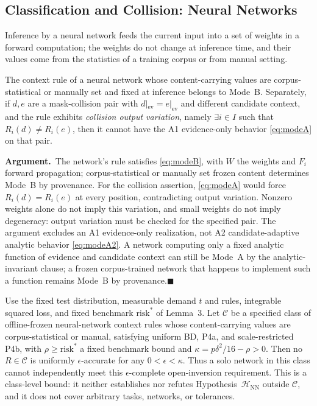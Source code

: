 \documentclass[twoside,11pt]{article}
\newcommand{\argument}{\par\medskip\noindent\textbf{Argument.}\ }
\newcommand{\qedbox}{\hfill$\blacksquare$}
\newcommand{\ev}{\mathrm{ev}}
\begin{document}
\subsection{Classification and Collision: Neural Networks}

Inference by a neural network feeds the current input into a set of weights in a forward computation; the weights do not change at inference time, and their values come from the statistics of a training corpus or from manual setting.

\begin{proposition}
The context rule of a neural network whose content-carrying values are corpus-statistical or manually set and fixed at inference belongs to Mode~B. Separately, if $d,e$ are a mask-collision pair with $d|_{\ev}=e|_{\ev}$ and different candidate context, and the rule exhibits \emph{collision output variation}, namely $\exists i\in I$ such that $R_i(d)\neq R_i(e)$, then it cannot have the A1 evidence-only behavior \eqref{eq:modeA} on that pair.
\label{prop:modeB}%
\end{proposition}

\argument The network's rule satisfies \eqref{eq:modeB}, with $W$ the weights and $F_i$ forward propagation; corpus-statistical or manually set frozen content determines Mode~B by provenance. For the collision assertion, \eqref{eq:modeA} would force $R_i(d)=R_i(e)$ at every position, contradicting output variation. Nonzero weights alone do not imply this variation, and small weights do not imply degeneracy: output variation must be checked for the specified pair. The argument excludes an A1 evidence-only realization, not A2 candidate-adaptive analytic behavior \eqref{eq:modeA2}. A network computing only a fixed analytic function of evidence and candidate context can still be Mode~A by the analytic-invariant clause; a frozen corpus-trained network that happens to implement such a function remains Mode~B by provenance.\qedbox

\begin{theorem}
Use the fixed test distribution, measurable demand $t$ and rules, integrable squared loss, and fixed benchmark $\mathrm{risk}^*$ of Lemma~3. Let $\mathcal{C}$ be a specified class of offline-frozen neural-network context rules whose content-carrying values are corpus-statistical or manual, satisfying uniform BD, P4a, and scale-restricted P4b, with $\rho\ge\mathrm{risk}^*$ a fixed benchmark bound and $\kappa=p\delta^2/16-\rho>0$. Then no $R\in\mathcal{C}$ is uniformly $\epsilon$-accurate for any $0<\epsilon<\kappa$. Thus a solo network in this class cannot independently meet this $\epsilon$-complete open-inversion requirement. This is a class-level bound: it neither establishes nor refutes Hypothesis~$\mathcal{H}_{\mathrm{NN}}$ outside $\mathcal{C}$, and it does not cover arbitrary tasks, networks, or tolerances.
\label{thm:main}%
\end{theorem}
\end{document}
